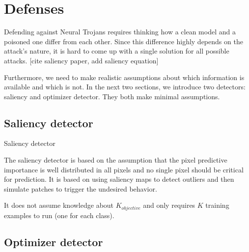 \documentclass[letterpaper, 10 pt, conference]{ieeeconf}  %
\makeatletter
\def\BState{\State\hskip-\ALG@thistlm}
\makeatother
\begin{document}
\section{Defenses}

Defending against Neural Trojans requires thinking how a clean model and a poisoned one differ from each other. Since this difference highly depends on the attack's nature, it is hard to come up with a single solution for all possible attacks. [cite saliency paper, add saliency equation]

Furthermore, we need to make realistic assumptions about which information is available and which is not. In the next two sections, we introduce two detectors: saliency and optimizer detector. They both make minimal assumptions.

\subsection{Saliency detector}


\begin{algorithm}
\caption{Saliency detector}\label{euclid}


\end{algorithm}


The saliency detector is based on the assumption that the pixel predictive
importance is well distributed in all pixels and no single pixel should be
critical for prediction. It is based on using saliency maps \cite{saliency}
to detect outliers and then simulate patches to trigger the undesired
behavior.

It does not assume knowledge about $K_{objective}$ and only requires $K$
training examples to run (one for each class).


\subsection{Optimizer detector}
\end{document}
